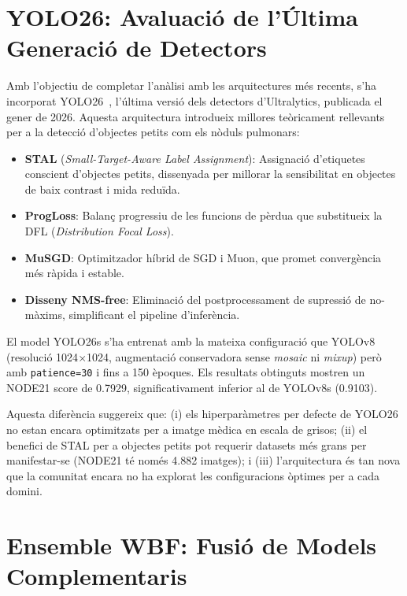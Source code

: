 \documentclass[conference]{IEEEtran}
\begin{document}
\section{YOLO26: Avaluació de l'Última Generació de Detectors}

Amb l'objectiu de completar l'anàlisi amb les arquitectures més recents, s'ha incorporat YOLO26~\cite{yolo26}, l'última versió dels detectors d'Ultralytics, publicada el gener de 2026. Aquesta arquitectura introdueix millores teòricament rellevants per a la detecció d'objectes petits com els nòduls pulmonars:

\begin{itemize}
    \item \textbf{STAL} (\textit{Small-Target-Aware Label Assignment}): Assignació d'etiquetes conscient d'objectes petits, dissenyada per millorar la sensibilitat en objectes de baix contrast i mida reduïda.
    \item \textbf{ProgLoss}: Balanç progressiu de les funcions de pèrdua que substitueix la DFL (\textit{Distribution Focal Loss}).
    \item \textbf{MuSGD}: Optimitzador híbrid de SGD i Muon, que promet convergència més ràpida i estable.
    \item \textbf{Disseny NMS-free}: Eliminació del postprocessament de supressió de no-màxims, simplificant el pipeline d'inferència.
\end{itemize}

El model YOLO26s s'ha entrenat amb la mateixa configuració que YOLOv8 (resolució 1024$\times$1024, augmentació conservadora sense \textit{mosaic} ni \textit{mixup}) però amb \texttt{patience=30} i fins a 150 èpoques. Els resultats obtinguts mostren un NODE21 score de 0.7929, significativament inferior al de YOLOv8s (0.9103).

Aquesta diferència suggereix que: (i) els hiperparàmetres per defecte de YOLO26 no estan encara optimitzats per a imatge mèdica en escala de grisos; (ii) el benefici de STAL per a objectes petits pot requerir datasets més grans per manifestar-se (NODE21 té només 4.882 imatges); i (iii) l'arquitectura és tan nova que la comunitat encara no ha explorat les configuracions òptimes per a cada domini.

\section{Ensemble WBF: Fusió de Models Complementaris}
\end{document}
